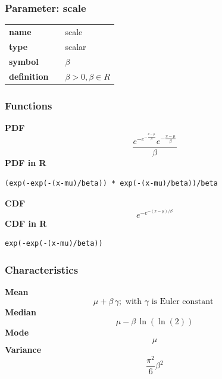 \subsubsection*{Parameter: scale}

\noindent\begin{tabular}{p{2cm}cl}
\textbf{name} & & scale \\
\textbf{type} & & scalar \\
\textbf{symbol} & & $\beta$  \\
\textbf{definition} & & $\beta>0, \beta \in  R$
\end{tabular}
\subsubsection*{Functions}

\smallskip \noindent \hspace{.2cm} \textbf{PDF} 
\begin{equation*}\frac{e^{-e^{-\frac{x-\mu}{\beta}}} e^{-\frac{x-\mu}{\beta}}}{\beta}\end{equation*}
\smallskip \noindent \hspace{.2cm} \textbf{PDF in R}  
\begin{verbatim}(exp(-exp(-(x-mu)/beta)) * exp(-(x-mu)/beta))/beta\end{verbatim}
\smallskip \noindent \hspace{.2cm} \textbf{CDF} 
\begin{equation*}e^{-e^{-(x-\mu)/\beta}}\end{equation*}
\smallskip \noindent \hspace{.2cm} \textbf{CDF in R} 
\begin{verbatim}exp(-exp(-(x-mu)/beta))\end{verbatim}
\smallskip
\subsubsection*{Characteristics}
\smallskip \noindent \hspace{.2cm} \textbf{Mean} 
\begin{equation*}\mu + \beta\,\gamma; \text{ with } \gamma \text{ is Euler constant }\end{equation*}
\smallskip \noindent \hspace{.2cm} \textbf{Median} 
\begin{equation*}\mu - \beta\,\ln(\ln(2))\end{equation*}
\smallskip \noindent \hspace{.2cm} \textbf{Mode} 
\begin{equation*}\mu\end{equation*}
\smallskip \noindent \hspace{.2cm} \textbf{Variance} 
\begin{equation*}\frac{\pi^2}{6} \beta^2\end{equation*}
\smallskip

